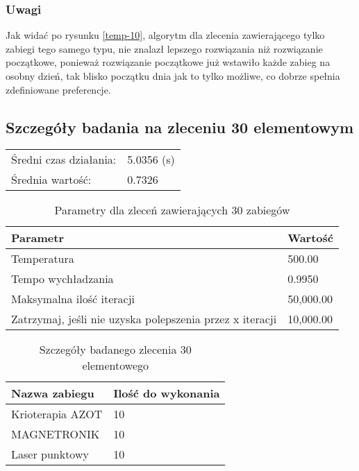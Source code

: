\subsubsection{Uwagi} 
Jak widać po rysunku \ref{temp-10}, algorytm dla zlecenia
zawierającego tylko zabiegi tego samego typu, nie znalazł lepszego rozwiązania
niż rozwiązanie początkowe, ponieważ rozwiązanie początkowe już wstawiło każde zabieg na osobny dzień, tak blisko początku dnia jak to tylko możliwe, co dobrze spełnia zdefiniowane preferencje.

\newpage
\subsection{Szczegóły badania na zleceniu 30 elementowym}
\begin{table}[H]
\begin{tabular}{ l l }
	Średni czas działania: & 5.0356 (s) \\
Średnia wartość: & 0.7326 \\
\end{tabular}
\end{table}

\begin{table}[H]
\centering
\begin{tabularx}{1\textwidth}{ | l | X | }
\hline
\bfseries Parametr & \bfseries Wartość \\
\hline
Temperatura & 500.00 \\
\hline
Tempo wychładzania & 0.9950 \\
\hline
Maksymalna ilość iteracji & 50,000.00 \\
\hline
Zatrzymaj, jeśli nie uzyska polepszenia przez x iteracji & 10,000.00 \\
\hline
\end{tabularx}
\caption{Parametry dla zleceń zawierających 30 zabiegów}
\end{table}

\begin{table}[H]
\centering
\begin{tabularx}{1\textwidth}{ | X | l | }
\hline
\bfseries Nazwa zabiegu & \bfseries Ilość do wykonania \\
\hline
Krioterapia AZOT & 10 \\
\hline
MAGNETRONIK & 10 \\
\hline
Laser punktowy & 10 \\
\hline
\end{tabularx}
\caption{Szczegóły badanego zlecenia 30 elementowego}
\end{table}

